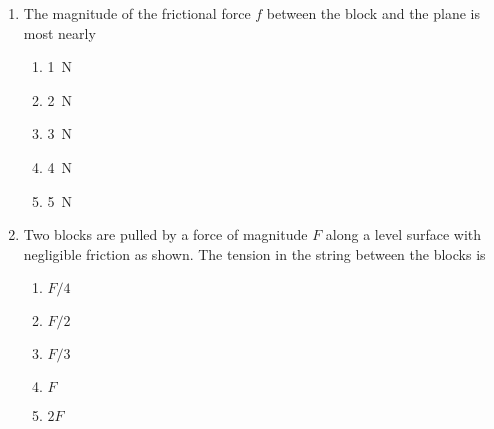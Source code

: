 \documentclass{../../oss-apphys}
\begin{document}
\begin{multicols}{2}
\begin{enumerate}[resume,leftmargin=18pt]
  \item The magnitude of the frictional force $f$ between the block and the
    plane is most nearly
    \begin{enumerate}[noitemsep,topsep=0pt,leftmargin=18pt,label=(\Alph*)]
    \item\SI{1}{\newton}
    \item\SI{2}{\newton}
    \item\SI{3}{\newton}
    \item\SI{4}{\newton}
    \item\SI{5}{\newton}
    \end{enumerate}
    \label{fk}
    \columnbreak
    

  \item Two blocks are pulled by a force of magnitude $F$ along a level surface
    with negligible friction as shown. The tension in the string between the
    blocks is
    \begin{center}
      \vspace{-.1in}
    \end{center}
    \begin{enumerate}[noitemsep,topsep=0pt,leftmargin=18pt,label=(\Alph*)]
    \item $F/4$
    \item $F/2$
    \item $F/3$
    \item $F$
    \item $2F$
    \end{enumerate}
    

\end{enumerate}
\end{multicols}
\end{document}
